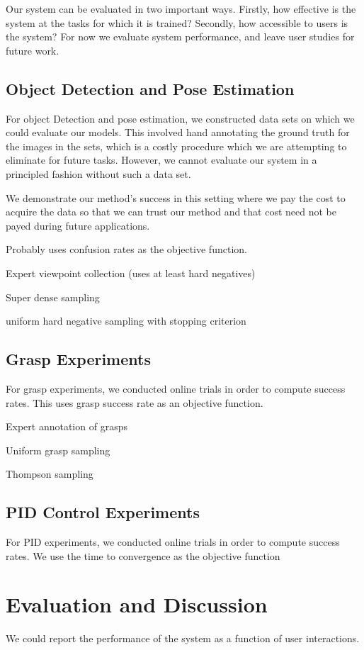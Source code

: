 \documentclass[conference]{IEEEtran}
\begin{document}
Our system can be evaluated in two important ways. Firstly, how effective is 
the system at the tasks for which it is trained? Secondly, how accessible to users is the system?
For now we evaluate system performance, and leave user studies for future work.

\subsection{Object Detection and Pose Estimation}
For object Detection and pose estimation, we constructed data
sets on which we could evaluate our models. This involved hand
annotating the ground truth for the images in the sets, which is a
costly procedure which we are attempting to eliminate for future tasks.
However, we cannot evaluate our system in a principled fashion without such
a data set.

We demonstrate our method's success in this setting where we pay the cost
to acquire the data so that we can trust our method and that cost need not be 
payed during future applications. 

Probably uses confusion rates as the objective function.

Expert viewpoint collection (uses at least hard negatives)

Super dense sampling

uniform hard negative sampling with stopping criterion

\subsection{Grasp Experiments}
For grasp experiments, we conducted online trials in order to compute success rates.
This uses grasp success rate as an objective function.

Expert annotation of grasps

Uniform grasp sampling

Thompson sampling

\subsection{PID Control Experiments}
For PID experiments, we conducted online trials in order to compute success rates.
We use the time to convergence as the objective function




\section{Evaluation and Discussion}
We could report the performance of the system as a function of user interactions.
\end{document}
